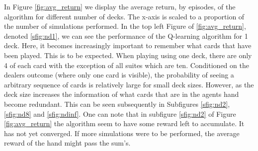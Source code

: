 In Figure \ref{fig:avg_return} we display the average return, by episodes, of the algorithm for different number of decks. The x-axis is scaled to a proportion of the number of simulations performed. In the top left Figure of \ref{fig:avg_return}, denoted \ref{sfig:nd1}, we can see the performance of the Q-learning algorithm for 1 deck. Here, it becomes increasingly important to remember what cards that have been played. This is to be expected. When playing using one deck, there are only 4 of each card with the exception of all suites which are ten. Conditioned on the dealers outcome (where only one card is visible), the probability of seeing a arbitrary sequence of cards is relatively large for small deck sizes. However, as the deck size increases the information of what cards that are in the agents hand become redundant. This can be seen subsequently in Subfigures \ref{sfig:nd2}, \ref{sfig:nd8} and \ref{sfig:ndinf}. One can note that in subfigure \ref{sfig:nd2} of Figure \ref{fig:avg_return} the algorithm seem to have some reward left to accumulate. It has not yet converged. If more simulations were to be performed, the average reward of the hand might pass the sum's. 
